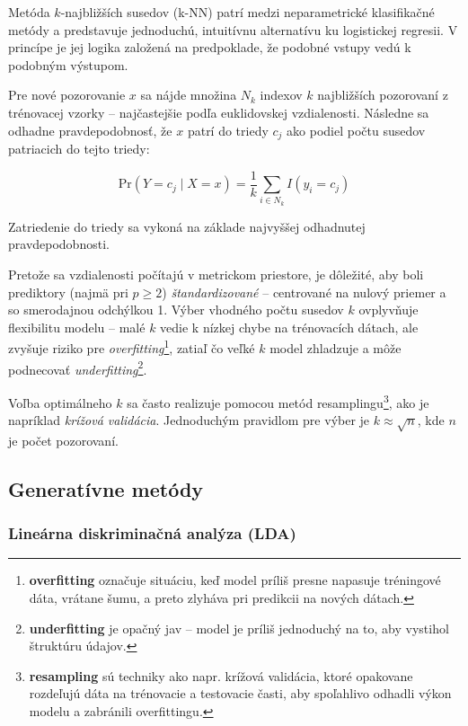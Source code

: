 Metóda $k$-najbližších susedov (k-NN) patrí medzi neparametrické klasifikačné metódy a predstavuje jednoduchú, intuitívnu alternatívu ku logistickej regresii. V princípe je jej logika založená na predpoklade, že podobné vstupy vedú k podobným výstupom.

Pre nové pozorovanie $x$ sa nájde množina $N_k$ indexov $k$ najbližších pozorovaní z trénovacej vzorky – najčastejšie podľa euklidovskej vzdialenosti. Následne sa odhadne pravdepodobnosť, že $x$ patrí do triedy $c_j$ ako podiel počtu susedov patriacich do tejto triedy:

\begin{equation}
\mathrm{Pr}(Y = c_j \mid X = x) = \frac{1}{k} \sum_{i \in N_k} I(y_i = c_j)
\end{equation}

Zatriedenie do triedy sa vykoná na základe najvyššej odhadnutej pravdepodobnosti.

Pretože sa vzdialenosti počítajú v metrickom priestore, je dôležité, aby boli prediktory (najmä pri $p \geq 2$) \textit{štandardizované} – centrované na nulový priemer a so smerodajnou odchýlkou 1. Výber vhodného počtu susedov $k$ ovplyvňuje flexibilitu modelu – malé $k$ vedie k nízkej chybe na trénovacích dátach, ale zvyšuje riziko pre \textit{overfitting}\footnote{%
\textbf{overfitting} označuje situáciu, keď model príliš presne napasuje tréningové dáta, vrátane šumu, a preto zlyháva pri predikcii na nových dátach.}, zatiaľ čo veľké $k$ model zhladzuje a môže podnecovať \textit{underfitting}\footnote{\textbf{underfitting} je opačný jav – model je príliš jednoduchý na to, aby vystihol štruktúru údajov.}.

Voľba optimálneho $k$ sa často realizuje pomocou metód resamplingu\footnote{\textbf{resampling} sú techniky ako napr. krížová validácia, ktoré opakovane rozdeľujú dáta na trénovacie a testovacie časti, aby spoľahlivo odhadli výkon modelu a zabránili overfittingu.}, ako je napríklad \textit{krížová validácia}. Jednoduchým pravidlom pre výber je $k \approx \sqrt{n}$, kde $n$ je počet pozorovaní.



\subsection{Generatívne metódy}
\label{subsec:gener_methods}

\subsubsection{Lineárna diskriminačná analýza (LDA)}
\label{subsubsec:lda}

